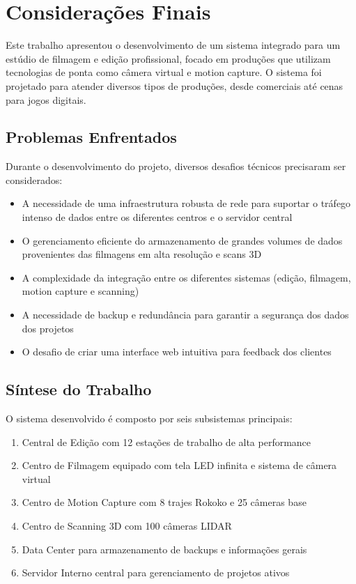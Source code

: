  

\chapter{Considerações Finais}

Este trabalho apresentou o desenvolvimento de um sistema integrado para um estúdio de filmagem e edição profissional, focado em produções que utilizam tecnologias de ponta como câmera virtual e motion capture. O sistema foi projetado para atender diversos tipos de produções, desde comerciais até cenas para jogos digitais.

\section{Problemas Enfrentados}
Durante o desenvolvimento do projeto, diversos desafios técnicos precisaram ser considerados:

\begin{itemize}
    \item A necessidade de uma infraestrutura robusta de rede para suportar o tráfego intenso de dados entre os diferentes centros e o servidor central
    \item O gerenciamento eficiente do armazenamento de grandes volumes de dados provenientes das filmagens em alta resolução e scans 3D
    \item A complexidade da integração entre os diferentes sistemas (edição, filmagem, motion capture e scanning)
    \item A necessidade de backup e redundância para garantir a segurança dos dados dos projetos
    \item O desafio de criar uma interface web intuitiva para feedback dos clientes
\end{itemize}

\section{Síntese do Trabalho}
O sistema desenvolvido é composto por seis subsistemas principais:

\begin{enumerate}
    \item Central de Edição com 12 estações de trabalho de alta performance
    \item Centro de Filmagem equipado com tela LED infinita e sistema de câmera virtual
    \item Centro de Motion Capture com 8 trajes Rokoko e 25 câmeras base
    \item Centro de Scanning 3D com 100 câmeras LIDAR
    \item Data Center para armazenamento de backups e informações gerais
    \item Servidor Interno central para gerenciamento de projetos ativos
\end{enumerate}


